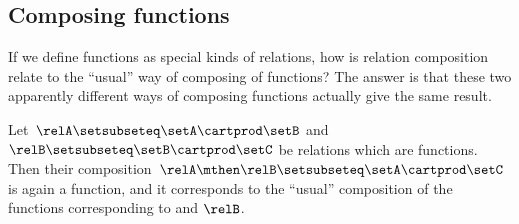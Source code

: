 \subsection{Composing functions}

If we define functions as special kinds of relations, how is relation composition relate to the ``usual'' way of composing of functions?
The answer is that these two apparently different ways of composing functions actually give the same result.

\begin{lemma}
    \label{lem:comprelfun}
    Let~$\relA \setsubseteq \setA \cartprod \setB$ and~$\relB \setsubseteq \setB \cartprod \setC$ be relations which are functions.
    Then their composition~$\relA \mthen \relB \setsubseteq \setA \cartprod \setC$ is again a function, and it corresponds to the ``usual'' composition of the functions corresponding to \relA and $\relB$.
\end{lemma}

